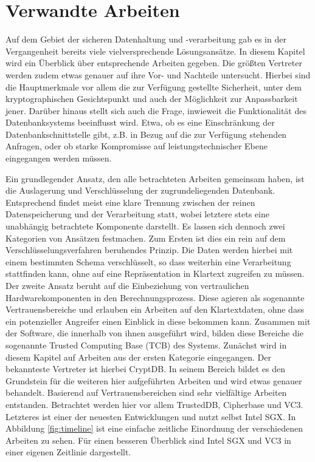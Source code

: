 \section{Verwandte Arbeiten}
Auf dem Gebiet der sicheren Datenhaltung und -verarbeitung gab es in der Vergangenheit bereits viele vielversprechende Lösungsansätze. In diesem Kapitel wird ein Überblick über entsprechende Arbeiten gegeben. Die größten Vertreter werden zudem etwas genauer auf ihre Vor- und Nachteile untersucht. Hierbei sind die Hauptmerkmale vor allem die zur Verfügung gestellte Sicherheit, unter dem kryptographischen Gesichtspunkt und auch der Möglichkeit zur Anpassbarkeit jener. Darüber hinaus stellt sich auch die Frage, inwieweit die Funktionalität des Datenbanksystems beeinflusst wird. Etwa, ob es eine Einschränkung der Datenbankschnittstelle gibt, z.B. in Bezug auf die zur Verfügung stehenden Anfragen, oder ob starke Kompromisse auf leistungstechnischer Ebene eingegangen werden müssen.

Ein grundlegender Ansatz, den alle betrachteten Arbeiten gemeinsam haben, ist die Auslagerung und Verschlüsselung der zugrundeliegenden Datenbank. Entsprechend findet meist eine klare Trennung zwischen der reinen Datenspeicherung und der Verarbeitung statt, wobei letztere stets eine unabhängig betrachtete Komponente darstellt. Es lassen sich dennoch zwei Kategorien von Ansätzen festmachen. Zum Ersten ist dies ein rein auf dem Verschlüsselungsverfahren beruhendes Prinzip. Die Daten werden hierbei mit einem bestimmten Schema verschlüsselt, so dass weiterhin eine Verarbeitung stattfinden kann, ohne auf eine Repräsentation in Klartext zugreifen zu müssen. Der zweite Ansatz beruht auf die Einbeziehung von vertraulichen Hardwarekomponenten in den Berechnungsprozess. Diese agieren als sogenannte Vertrauensbereiche und erlauben ein Arbeiten auf den Klartextdaten, ohne dass ein potenzieller Angreifer einen Einblick in diese bekommen kann. Zusammen mit der Software, die innerhalb von ihnen ausgeführt wird, bilden diese Bereiche die sogenannte Trusted Computing Base (TCB) des Systems.
Zunächst wird in diesem Kapitel auf Arbeiten aus der ersten Kategorie eingegangen. Der bekannteste Vertreter ist hierbei CryptDB. In seinem Bereich bildet es den Grundstein für die weiteren hier aufgeführten Arbeiten und wird etwas genauer behandelt. Basierend auf Vertrauensbereichen sind sehr vielfältige Arbeiten entstanden. Betrachtet werden hier vor allem TrustedDB, Cipherbase und VC3. Letzteres ist einer der neuesten Entwicklungen und nutzt selbst Intel SGX. In Abbildung \ref{fig:timeline} ist eine einfache zeitliche Einordnung der verschiedenen Arbeiten zu sehen. Für einen besseren Überblick sind Intel SGX und VC3 in einer eigenen Zeitlinie dargestellt.

